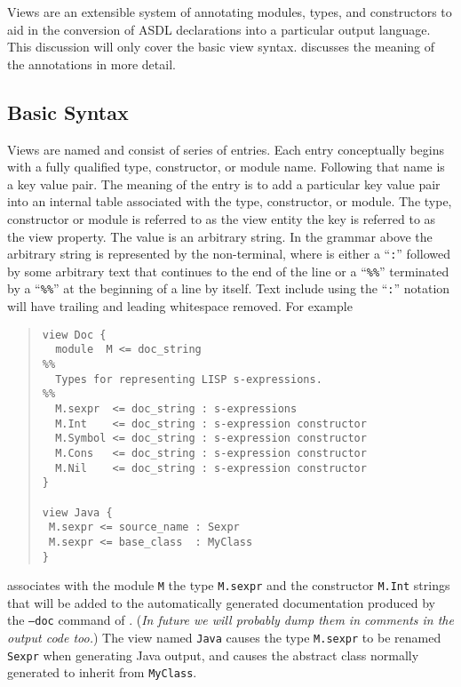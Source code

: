 Views are an extensible system of annotating modules, types, and
constructors to aid in the conversion of ASDL declarations into a
particular output language. This discussion will only cover the basic view
syntax.
 discusses the meaning of the annotations in more detail.

\subsection{Basic Syntax}
Views are named and consist of series of entries.
Each entry conceptually
begins with a fully qualified type, constructor, or module name. Following
that name is a key value pair.
The meaning of the entry is to add a
particular key value pair into an internal table associated with the type,
constructor, or module.
The type, constructor or module is referred to as
the view entity the key is referred to as the view property.
The value is an arbitrary string.
In the grammar above the arbitrary string is represented
by the  non-terminal, where  is either a ``\lstinline!:!''
followed by some arbitrary text that continues to the end of the line or a
``\lstinline!%%!'' terminated by a ``\lstinline!%%!'' at the beginning of a line by itself. 
Text include using the ``\lstinline!:!'' notation will have trailing and leading 
whitespace removed. For example
%
\begin{quote}\begin{lstlisting}[language=ASDL]
view Doc {
  module  M <= doc_string
%%
  Types for representing LISP s-expressions.
%%
  M.sexpr  <= doc_string : s-expressions 
  M.Int    <= doc_string : s-expression constructor
  M.Symbol <= doc_string : s-expression constructor
  M.Cons   <= doc_string : s-expression constructor
  M.Nil    <= doc_string : s-expression constructor
}

view Java {
 M.sexpr <= source_name : Sexpr
 M.sexpr <= base_class  : MyClass
}
\end{lstlisting}\end{quote}%
%
associates with the module \lstinline[language=ASDL]!M! the type
\lstinline[language=ASDL]!M.sexpr! and the
constructor \lstinline[language=ASDL]!M.Int!
strings that will be added to the automatically generated documentation
produced by the \texttt{--doc} command of \asdlgen{}.
(\emph{In future we will probably dump them in comments in the output code too.})
The view named \lstinline[language=ASDL]!Java! causes the type
\lstinline[language=ASDL]!M.sexpr! to be renamed \lstinline[language=ASDL]!Sexpr! when
generating Java output, and causes the abstract class normally generated to
inherit from \lstinline[language=ASDL]!MyClass!. 

